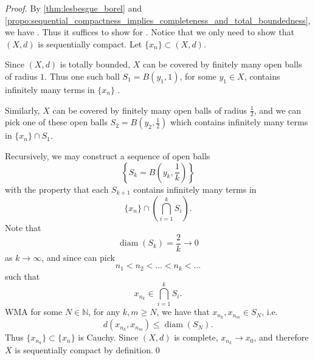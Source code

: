 \documentclass[notoc,notitlepage]{tufte-book}
\DeclareMathOperator{\diam}{diam }
\begin{document}
\begin{proof}
  By \cref{thm:lesbesgue_borel} and \cref{propo:sequential_compactness_implies_completeness_and_total_boundedness}, we have . Thus it suffices to show for . Notice that we only need to show that $(X, d)$ is sequentially compact. Let $\{ x_n \} \subset (X, d)$.
  
  Since $(X, d)$ is totally bounded, $X$ can be covered by finitely many open balls of radius $1$. Thus one such ball $S_1 = B(y_1, 1)$, for some $y_1 \in X$, contains infinitely many terms in $\{ x_n \}$ .

  Similarly, $X$ can be covered by finitely many open balls of radius $\frac{1}{2}$, and we can pick one of these open balls $S_2 = B\left(y_2, \frac{1}{2}\right)$ which contains infinitely many terms in $\{ x_n \} \cap S_1$.

  Recursively, we may construct a sequence of open balls 
  \begin{equation*}
    \left\{ S_k = B\left(y_k, \frac{1}{k}\right) \right\}
  \end{equation*}
  with the property that each $S_{k + 1}$ contains infinitely many terms in
  \begin{equation*}
    \{ x_n \} \cap \left( \bigcap_{i=1}^{k} S_i \right).
  \end{equation*}
  Note that
  \begin{equation*}
    \diam(S_k) = \frac{2}{k} \to 0
  \end{equation*}
  as $k \to \infty$, and since can pick
  \begin{equation*}
    n_1 < n_2 < \hdots < n_k < \hdots
  \end{equation*}
  such that
  \begin{equation*}
    x_{n_k} \in \bigcap_{i=1}^{k} S_i.
  \end{equation*}
  WMA for some $N \in \mathbb{N}$, for any $k, m \geq N$, we have that $x_{n_k}, x_{n_m} \in S_N$, i.e.
  \begin{equation*}
    d(x_{n_k}, x_{n_m}) \leq \diam(S_N).
  \end{equation*}
  Thus $\{ x_{n_k} \} \subset \{ x_n \}$ is Cauchy. Since $(X, d)$ is complete, $x_{n_k} \to x_0$, and therefore $X$ is sequentially compact by definition.\qed\
\end{proof}

\end{document}
